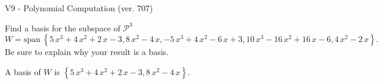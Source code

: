 \begin{exercise}
  \begin{exerciseTitle}V9 - Polynomial Computation (ver. 707)\end{exerciseTitle}
  \begin{exerciseStatement}
    Find a basis for the subspace of \(\mathcal{P}^3\) 
\[W=\mathrm{span}\ \left\{5 \, x^{3} + 4 \, x^{2} + 2 \, x - 3 , 8 \, x^{2} - 4 \, x , -5 \, x^{3} + 4 \, x^{2} - 6 \, x + 3 , 10 \, x^{3} - 16 \, x^{2} + 16 \, x - 6 , 4 \, x^{2} - 2 \, x\right\}.\]
 Be sure to explain why your result is a basis.


  \end{exerciseStatement}
  \begin{exerciseAnswer}
   A basis of \(W\) is  \(\left\{5 \, x^{3} + 4 \, x^{2} + 2 \, x - 3 , 8 \, x^{2} - 4 \, x\right\}\).
  


  \end{exerciseAnswer}
\end{exercise}